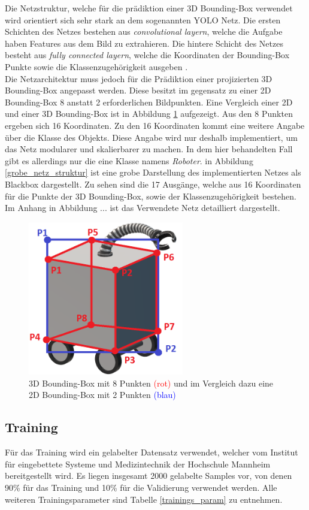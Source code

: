 Die Netzstruktur, welche für die prädiktion einer 3D Bounding-Box verwendet wird orientiert sich sehr stark an dem sogenannten YOLO Netz. Die ersten Schichten des Netzes bestehen aus \textit{convolutional layern}, welche die Aufgabe haben Features aus dem Bild zu extrahieren. Die hintere Schicht des Netzes besteht aus  \textit{fully connected layern}, welche die Koordinaten der Bounding-Box Punkte sowie die Klassenzugehörigkeit  ausgeben \cite{Redmon2016}. \\Die Netzarchitektur muss jedoch für die Prädiktion einer projizierten 3D Bounding-Box angepasst werden. Diese besitzt im gegensatz zu einer 2D Bounding-Box 8 anstatt 2 erforderlichen Bildpunkten. Eine Vergleich einer 2D und einer 3D Bounding-Box ist in Abbildung \ref{3D_Bounding_roboter} aufgezeigt. Aus den 8 Punkten ergeben sich 16 Koordinaten. Zu den 16 Koordinaten kommt eine weitere Angabe über die Klasse des Objekts. Diese Angabe wird nur deshalb implementiert, um das Netz modularer und skalierbarer zu  machen. In dem hier behandelten Fall gibt es allerdings nur die eine Klasse namens \textit{Roboter}. in Abbildung \ref{grobe_netz_struktur} ist eine grobe Darstellung des implementierten Netzes als Blackbox dargestellt. Zu sehen sind die 17 Ausgänge, welche aus 16 Koordinaten für die Punkte der 3D Bounding-Box, sowie der Klassenzugehörigkeit bestehen. Im Anhang in Abbildung ... ist das Verwendete Netz detailliert dargestellt.

\begin{figure}[!htb]
  \centering
  \includegraphics[width=6.8cm]{Abb/3d_robotter_mit_boundig_box_2d_vs_3d.PNG}
  \caption{3D Bounding-Box mit 8 Punkten \textcolor{red}{(rot)} und im Vergleich dazu eine 2D Bounding-Box mit 2 Punkten \textcolor{blue}{(blau)} }
  \label{3D_Bounding_roboter}
\end{figure} 

\newpage
\subsection{Training}
Für das Training wird ein gelabelter Datensatz verwendet, welcher vom Institut für eingebettete Systeme und Medizintechnik der Hochschule Mannheim bereitgestellt wird. Es liegen insgesamt 2000 gelabelte Samples vor, von denen 90\% für das Training und 10\% für die Validierung verwendet werden. Alle weiteren Trainingsparameter sind Tabelle \ref{trainings_param} zu entnehmen.\\

